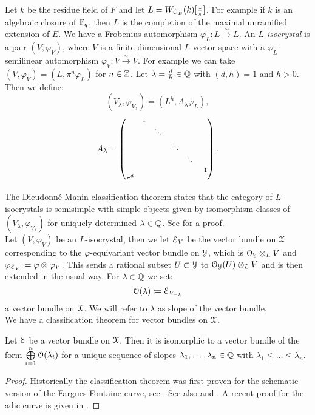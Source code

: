 Let $k$ be the residue field of $F$ and let $L=W_{\mathcal{O}_E}(k)[\tfrac{1}{\pi}]$. For example if $k$ is an algebraic closure of $\mathbb{F}_q$, then $L$ is the completion of the maximal unramified extension of $E$. We have a Frobenius automorphism $\varphi_L\colon L\xrightarrow{\sim}L$.
An $L$\emph{-isocrystal} is a pair $(V,\varphi_V)$, where $V$ is a finite-dimensional $L$-vector space with a $\varphi_L$-semilinear automorphism $\varphi_V\colon V\xrightarrow{\sim}V$.
For example we can take  $(V,\varphi_V) = (L, \pi^n\varphi_L)$ for $n\in\mathbb{Z}$.
Let $\lambda=\tfrac{d}{h}\in\mathbb{Q}$ with $(d,h)=1$ and $h>0$. Then we define:
\[(V_{\lambda},\varphi_{V_{\lambda}}) = (L^h, A_\lambda\varphi_L),\]
\vspace{1mm}
\[A_\lambda = 	\begin{scriptsize}
			\begin{pmatrix}
			 & 1 &  &  &  & \\
			&  & \ddots &  &  & \\
			&  &  &\ddots  & & \\
			& & &  & \ddots & \\
			& & &  &  & 1\\
			\pi^d & & & &  & \\
			\end{pmatrix}
			\end{scriptsize}
.\]


\vspace{5mm}
The Dieudonn\'e-Manin classification theorem states that the category of $L$-isocrystals is semisimple with simple objects given by isomorphism classes of 
$(V_{\lambda},\varphi_{V_{\lambda}})$ for uniquely determined $\lambda\in\mathbb{Q}$. See \cite[theorem 1.3]{DingOuyang-DM} for a proof.\\

Let $(V,\varphi_V)$ be an $L$-isocrystal, then we let $\mathcal{E}_V$ be the vector bundle on $\mathcal{X}$ corresponding to the $\varphi$-equivariant vector bundle on $\mathcal{Y}$, which is
$\mathcal{O}_{\mathcal{Y}}\otimes_{L}V$ and $\varphi_{\mathcal{E}_V}\coloneqq\varphi\otimes\varphi_{V}$. This sends a rational subset $U\subset\mathcal{Y}$ to
$\mathcal{O}_{\mathcal{Y}}(U)\otimes_{L}V$ and is then extended in the usual way.
For $\lambda\in\mathbb{Q}$ we set:
\[\mathcal{O}(\lambda)\coloneqq \mathcal{E}_{V_{-\lambda}}\]
a vector bundle on $\mathcal{X}$.
We will refer to $\lambda$ as slope of the vector bundle.\\

We have a classification theorem for vector bundles on $\mathcal{X}$.

\begin{theorem}
Let $\mathcal{E}$ be a vector bundle on $\mathcal{X}$.
Then it is isomorphic to a vector bundle of the form $\bigoplus\limits_{i=1}^{n}\mathcal{O}(\lambda_{i})$ for a unique sequence of slopes $\lambda_1,\dots,\lambda_n\in\mathbb{Q}$ with $\lambda_1\leq\dots\leq\lambda_n$.
\end{theorem}
\begin{proof}
Historically the classification theorem was first proven for the schematic version of the Fargues-Fontaine curve, see \cite{FF11}.
See also \cite[th\'eor\`eme 3.5, th\'eor\`eme 3.1]{Fargues15} and \cite{KL15}. %
A recent proof for the adic curve is given in \cite[theorem II.2.14]{FS2021}.
\end{proof}


